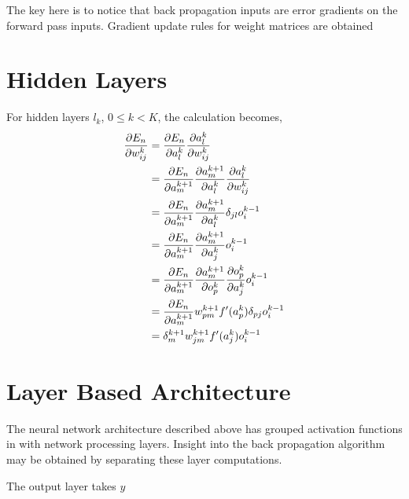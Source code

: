 \documentclass[12pt,notitlepage]{article}
\begin{document}
The key here is to notice that back propagation inputs are error
gradients on the forward pass inputs.  Gradient update rules for
weight matrices are obtained 
\section{Hidden Layers}
\label{sec:hidden-layers}

For hidden layers $l_{k}$, $0 \le k < K$, the calculation becomes,
\begin{equation}
  \label{eq:error-grad-hidden}
  \begin{split}
    \frac{\partial E_{n}}{\partial w^{k}_{ij}} &=
    \frac{\partial E_{n}}{\partial a_{l}^{k}}\frac{\partial a_{l}^{k}}{\partial w_{ij}^{k}}\\
    &=
    \frac{\partial E_{n}}{\partial a_{m}^{k+1}}\frac{\partial a_{m}^{k+1}}{\partial a_{l}^{k}}\frac{\partial a_{l}^{k}}{\partial w_{ij}^{k}}\\
    &=
    \frac{\partial E_{n}}{\partial a_{m}^{k+1}}\frac{\partial a_{m}^{k+1}}{\partial a_{l}^{k}}\delta_{jl}o_{i}^{k-1}\\
    &=
    \frac{\partial E_{n}}{\partial a_{m}^{k+1}}\frac{\partial a_{m}^{k+1}}{\partial a_{j}^{k}}o_{i}^{k-1}\\
    &=
    \frac{\partial E_{n}}{\partial a_{m}^{k+1}}\frac{\partial a_{m}^{k+1}}{\partial o_{p}^{k}}\frac{\partial o_{p}^{k}}{\partial a_{j}^{k}}o_{i}^{k-1}\\ 
    &=
    \frac{\partial E_{n}}{\partial a_{m}^{k+1}}w_{pm}^{k+1}f'(a_{p}^{k})\delta_{pj}o_{i}^{k-1}\\ 
    &= \delta^{k+1}_{m}w_{jm}^{k+1}f'(a_{j}^{k})o_{i}^{k-1}\\
  \end{split}
\end{equation}

\section{Layer Based Architecture}
\label{sec:layer-arch}
The neural network architecture described above has grouped activation
functions in with network processing layers.  Insight into the back
propagation algorithm may be obtained by separating these layer
computations.

The output layer takes $y$
\end{document}
